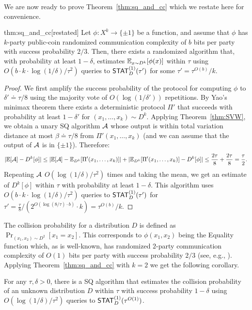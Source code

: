 We are now ready to prove Theorem~\ref{thm:sq_and_cc} which we restate here for convenience.
\begin{reptheorem}{thm:sq_and_cc}[restated]
Let $\phi:X^k \to \{\pm 1\}$ be a function, and assume that $\phi$ has $k$-party public-coin randomized communication complexity of $b$ bits per party with success probability $2/3$. Then, there exists a randomized algorithm that, with probability at least $1-\delta$, estimates $\mathbb E_{x \sim D^k}[\phi(x)]$ within $\tau$ using $O(b \cdot k \cdot \log(1/\delta)/\tau^2)$ queries to $\mathsf{STAT}^{(1)}_D(\tau')$ for some $\tau' = \tau^{O(b)}/k$.
\end{reptheorem}
\begin{proof}
We first amplify the success probability of the protocol for computing $\phi$ to $\delta'\doteq \tau/8$ using the majority vote of $O(\log(1/\delta'))$ repetitions. By Yao's minimax theorem \cite{Yao:1977} there exists a deterministic protocol $\Pi'$ that succeeds with probability at least $1-\delta'$ for $(x_1,\dots,x_k) \sim D^k$. Applying Theorem~\ref{thm:SVW}, we obtain a unary SQ algorithm $\mathcal{A}$ whose output is within total variation distance at most $\beta \doteq \tau/8$ from $\Pi'(x_1, \dots, x_k)$ (and we can assume that the output of $\mathcal{A}$ is in $\{\pm 1\}$). Therefore:
$$|\mathbb{E}[\mathcal{A}] - D^k[\phi]| \leq |\mathbb{E}[\mathcal{A}] - \mathbb{E}_{D^k} [\Pi'(x_1, \dots, x_k)]| + |\mathbb{E}_{D^k} [\Pi'(x_1, \dots, x_k)] - D^k [\phi]| \leq  \frac{2\tau}{8} + \frac{2\tau}{8} = \frac{\tau}{2}.$$
Repeating $\mathcal{A}$ $O(\log(1/\delta)/\tau^2)$ times and taking the mean, we get an estimate of $D^k[\phi]$ within $\tau$ with probability at least $1-\delta$. This algorithm uses $O(b \cdot k \cdot \log(1/\delta)/\tau^2)$ queries to $\mathsf{STAT}^{(1)}_D(\tau')$ for $\tau' = \frac{\tau}{8}/(2^{O(\log(8/\tau) \cdot b)} \cdot k) = \tau^{O(b)}/k$.
\end{proof}

The collision probability for a distribution $D$ is defined as $\Pr_{(x_1, x_2) \sim D^2}[x_1 = x_2]$. This corresponds to $\phi(x_1,x_2)$ being the Equality function which, as is well-known, has randomized $2$-party communication complexity of $O(1)$ bits per party with success probability $2/3$ (see, e.g., \cite{KN97}). Applying Theorem~\ref{thm:sq_and_cc} with $k=2$ we get the following corollary.
\begin{corollary}
For any $\tau, \delta >0$, there is a SQ algorithm that estimates the collision probability of an unknown distribution $D$ within $\tau$ with success probability $1-\delta$ using $O(\log(1/\delta)/\tau^2)$ queries to $\mathsf{STAT}^{(1)}_{D}(\tau^{O(1)})$.
\end{corollary} 